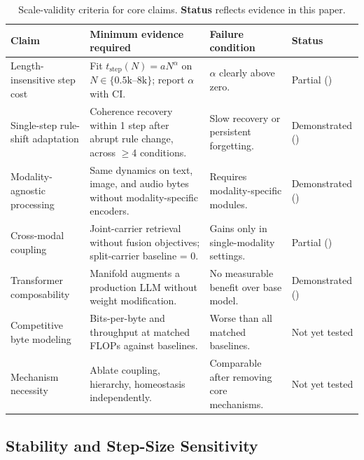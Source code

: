 \documentclass[11pt,a4paper]{article}
\begin{document}
\begin{table}[!htbp]
  \centering
  \caption{Scale-validity criteria for core claims.  \textbf{Status} reflects evidence in this paper.}
  \label{tab:scale_validity}
  \renewcommand{\arraystretch}{1.2}
  \begin{adjustbox}{max width=\textwidth}
  \begin{tabular}{P{0.18\textwidth} P{0.34\textwidth} P{0.22\textwidth} P{0.12\textwidth}}
    \toprule
    \textbf{Claim} & \textbf{Minimum evidence required} & \textbf{Failure condition} & \textbf{Status} \\
    \midrule
    Length-insensitive step cost & Fit $t_{\text{step}}(N)=aN^\alpha$ on $N\in\{0.5\mathrm{k}\text{--}8\mathrm{k}\}$; report $\alpha$ with CI. & $\alpha$ clearly above zero. & Partial () \\
    Single-step rule-shift adaptation & Coherence recovery within 1 step after abrupt rule change, across $\geq$4 conditions. & Slow recovery or persistent forgetting. & Demonstrated () \\
    Modality-agnostic processing & Same dynamics on text, image, and audio bytes without modality-specific encoders. & Requires modality-specific modules. & Demonstrated () \\
    Cross-modal coupling & Joint-carrier retrieval without fusion objectives; split-carrier baseline = 0. & Gains only in single-modality settings. & Partial () \\
    Transformer composability & Manifold augments a production LLM without weight modification. & No measurable benefit over base model. & Demonstrated () \\
    Competitive byte modeling & Bits-per-byte and throughput at matched FLOPs against baselines. & Worse than all matched baselines. & Not yet tested \\
    Mechanism necessity & Ablate coupling, hierarchy, homeostasis independently. & Comparable after removing core mechanisms. & Not yet tested \\
    \bottomrule
  \end{tabular}
  \end{adjustbox}
\end{table}

\subsection{Stability and Step-Size Sensitivity}
\label{sec:stability_exp}
\end{document}
